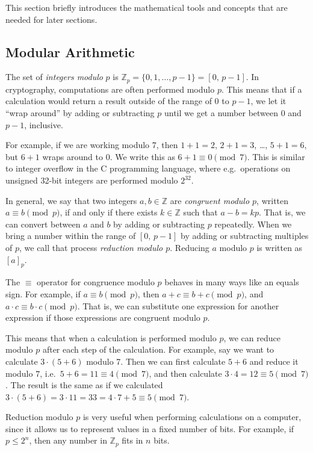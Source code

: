 \documentclass{article}
\begin{document}
This section briefly introduces the mathematical tools and concepts that are needed for later sections.

\subsection{Modular Arithmetic}\label{sec:modular-arithmetic}

The set of \emph{integers modulo} $p$ is $\mathbb{Z}_p = \{0, 1, \dots, p-1\} = [0,\, p-1]$.
In cryptography, computations are often performed modulo $p$.
This means that if a calculation would return a result outside of the range of 0 to $p-1$, we let it ``wrap around'' by adding or subtracting $p$ until we get a number between 0 and $p-1$, inclusive.

For example, if we are working modulo 7, then $1+1=2$, $2+1=3$, \dots, $5+1=6$, but $6+1$ wraps around to $0$.
We write this as $6+1 \equiv 0 \pmod{7}$.
This is similar to integer overflow in the C programming language, where e.g.\ operations on unsigned 32-bit integers are performed modulo $2^{32}$.

In general, we say that two integers $a, b \in \mathbb{Z}$ are \emph{congruent modulo $p$}, written $a \equiv b \pmod{p}$, if and only if there exists $k \in \mathbb{Z}$ such that $a - b = kp$.
That is, we can convert between $a$ and $b$ by adding or subtracting $p$ repeatedly.
When we bring a number within the range of $[0,\, p-1]$ by adding or subtracting multiples of $p$, we call that process \emph{reduction modulo $p$}.
Reducing $a$ modulo $p$ is written as $[a]_p$.

The $\equiv$ operator for congruence modulo $p$ behaves in many ways like an equals sign.
For example, if $a \equiv b \pmod{p}$, then $a+c \equiv b+c \pmod{p}$, and $a \cdot c \equiv b \cdot c \pmod{p}$.
That is, we can substitute one expression for another expression if those expressions are congruent modulo $p$.

This means that when a calculation is performed modulo $p$, we can reduce modulo $p$ after each step of the calculation.
For example, say we want to calculate $3 \cdot (5 + 6)$ modulo 7.
Then we can first calculate $5+6$ and reduce it modulo $7$, i.e.\ $5+6 = 11 \equiv 4 \pmod{7}$, and then calculate $3 \cdot 4 = 12 \equiv 5 \pmod{7}
$.
The result is the same as if we calculated $3 \cdot (5 + 6) = 3 \cdot 11 = 33 = 4 \cdot 7 + 5 \equiv 5 \pmod{7}$.

Reduction modulo $p$ is very useful when performing calculations on a computer, since it allows us to represent values in a fixed number of bits.
For example, if $p \le 2^n$, then any number in $\mathbb{Z}_p$ fits in $n$ bits.
\end{document}
